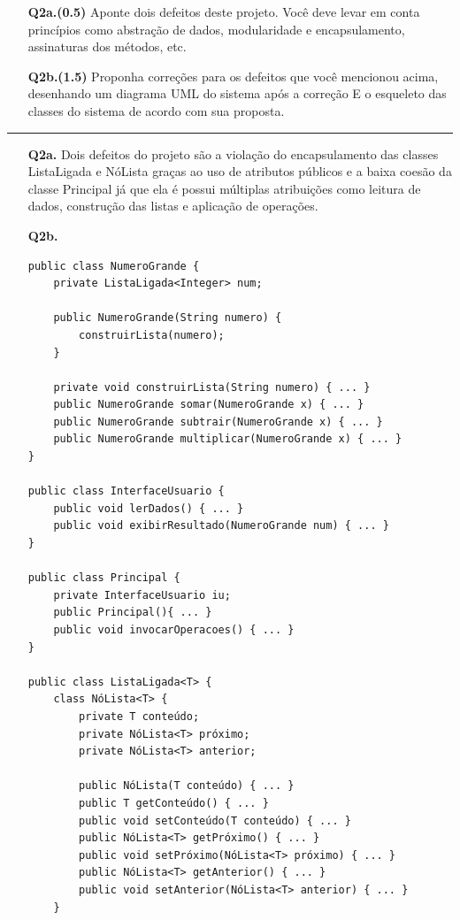 \documentclass[11pt]{article}
\begin{document}
\begin{itemize}
\begin{itemize}
\item[{\bf Q2a.(0.5)}] Aponte dois defeitos deste projeto. Você deve
  levar em conta princípios como abstração de dados, modularidade e
  encapsulamento, assinaturas dos métodos, etc. 
\item[{\bf Q2b.(1.5)}] Proponha correções para os defeitos que você
  mencionou acima, desenhando um diagrama UML do sistema após a
  correção E o esqueleto das classes do sistema de acordo com sua
  proposta. 
\end{itemize}

\hrule
\begin{itemize}
\item[{\bf Q2a.}] Dois defeitos do projeto são a violação do encapsulamento das
classes ListaLigada e NóLista graças ao uso de atributos públicos e a baixa
coesão da classe Principal já que ela é possui múltiplas atribuições como
leitura de dados, construção das listas e aplicação de operações.
  
\item[{\bf Q2b.}] 
{\small
\begin{verbatim}
public class NumeroGrande {
    private ListaLigada<Integer> num;

    public NumeroGrande(String numero) {
        construirLista(numero);
    }

    private void construirLista(String numero) { ... }
    public NumeroGrande somar(NumeroGrande x) { ... }
    public NumeroGrande subtrair(NumeroGrande x) { ... }
    public NumeroGrande multiplicar(NumeroGrande x) { ... }
}

public class InterfaceUsuario {
    public void lerDados() { ... }
    public void exibirResultado(NumeroGrande num) { ... }
}

public class Principal {
    private InterfaceUsuario iu;
    public Principal(){ ... }
    public void invocarOperacoes() { ... }
}

public class ListaLigada<T> {
    class NóLista<T> {
        private T conteúdo;
        private NóLista<T> próximo;
        private NóLista<T> anterior;

        public NóLista(T conteúdo) { ... }
        public T getConteúdo() { ... }
        public void setConteúdo(T conteúdo) { ... }
        public NóLista<T> getPróximo() { ... }
        public void setPróximo(NóLista<T> próximo) { ... }
        public NóLista<T> getAnterior() { ... }
        public void setAnterior(NóLista<T> anterior) { ... }
    }


\end{verbatim}}
\end{itemize}
\end{itemize}
\end{document}
